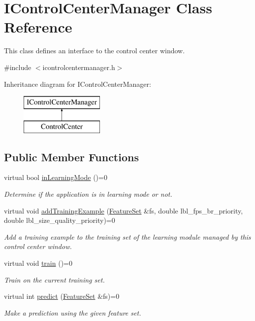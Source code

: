 \hypertarget{classIControlCenterManager}{\section{I\-Control\-Center\-Manager Class Reference}
\label{classIControlCenterManager}
}


This class defines an interface to the control center window.  




{\ttfamily \#include $<$icontrolcentermanager.\-h$>$}

Inheritance diagram for I\-Control\-Center\-Manager\-:\begin{figure}[H]
\begin{center}
\leavevmode
\includegraphics[height=2.000000cm]{classIControlCenterManager}
\end{center}
\end{figure}
\subsection*{Public Member Functions}
\begin{DoxyCompactItemize}
\item 
virtual bool \hyperlink{classIControlCenterManager_ab4f6172f09c27b73254ed7fcfe716790}{in\-Learning\-Mode} ()=0
\begin{DoxyCompactList}\small\item\em Determine if the application is in learning mode or not. \end{DoxyCompactList}\item 
virtual void \hyperlink{classIControlCenterManager_ad223b7089a7196da4edbb70adc2d333e}{add\-Training\-Example} (\hyperlink{classFeatureSet}{Feature\-Set} \&fs, double lbl\-\_\-fps\-\_\-br\-\_\-priority, double lbl\-\_\-size\-\_\-quality\-\_\-priority)=0
\begin{DoxyCompactList}\small\item\em Add a training example to the training set of the learning module managed by this control center window. \end{DoxyCompactList}\item 
virtual void \hyperlink{classIControlCenterManager_afa8cd51cefd2550330b22ff34497d90c}{train} ()=0
\begin{DoxyCompactList}\small\item\em Train on the current training set. \end{DoxyCompactList}\item 
virtual int \hyperlink{classIControlCenterManager_ac71a65d30f0b796d87859c60caa6c20f}{predict} (\hyperlink{classFeatureSet}{Feature\-Set} \&fs)=0
\begin{DoxyCompactList}\small\item\em Make a prediction using the given feature set. \end{DoxyCompactList}\end{DoxyCompactItemize}


